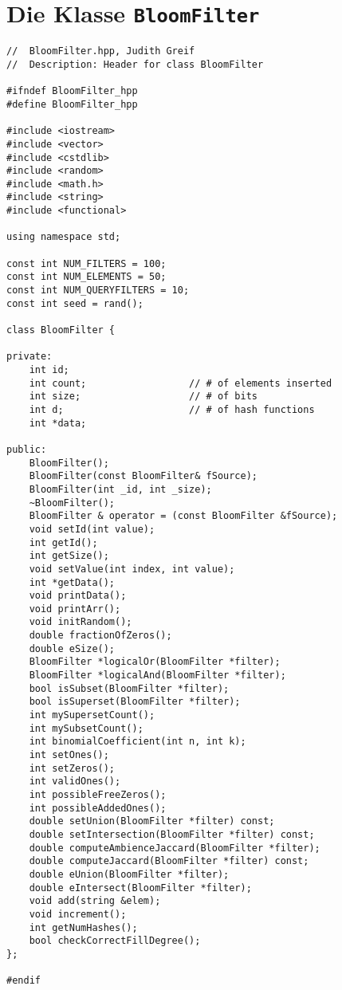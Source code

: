 \section{Die Klasse \texttt{BloomFilter}}\label{sec:BloomFilter.hpp}
\small{
\begin{verbatim}
//  BloomFilter.hpp, Judith Greif
//  Description: Header for class BloomFilter

#ifndef BloomFilter_hpp
#define BloomFilter_hpp

#include <iostream>
#include <vector>
#include <cstdlib>
#include <random>
#include <math.h>
#include <string>
#include <functional>

using namespace std;

const int NUM_FILTERS = 100;
const int NUM_ELEMENTS = 50;
const int NUM_QUERYFILTERS = 10;
const int seed = rand();

class BloomFilter {
    
private:
    int id;
    int count;                  // # of elements inserted
    int size;                   // # of bits
    int d;                      // # of hash functions
    int *data;
    
public:
    BloomFilter();
    BloomFilter(const BloomFilter& fSource);
    BloomFilter(int _id, int _size);
    ~BloomFilter();   
    BloomFilter & operator = (const BloomFilter &fSource);   
    void setId(int value);
    int getId();
    int getSize();
    void setValue(int index, int value);
    int *getData();   
    void printData();
    void printArr();
    void initRandom();
    double fractionOfZeros();
    double eSize();
    BloomFilter *logicalOr(BloomFilter *filter);
    BloomFilter *logicalAnd(BloomFilter *filter);
    bool isSubset(BloomFilter *filter);
    bool isSuperset(BloomFilter *filter);
    int mySupersetCount();
    int mySubsetCount();
    int binomialCoefficient(int n, int k);
    int setOnes();
    int setZeros();
    int validOnes();
    int possibleFreeZeros();
    int possibleAddedOnes();
    double setUnion(BloomFilter *filter) const;
    double setIntersection(BloomFilter *filter) const;
    double computeAmbienceJaccard(BloomFilter *filter);
    double computeJaccard(BloomFilter *filter) const;
    double eUnion(BloomFilter *filter);
    double eIntersect(BloomFilter *filter);
    void add(string &elem);
    void increment();
    int getNumHashes();
    bool checkCorrectFillDegree();
};

#endif
\end{verbatim}
}
\newpage
